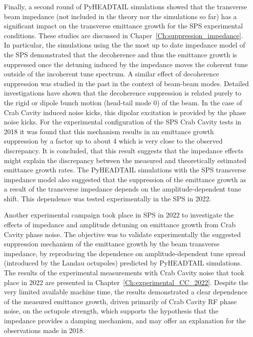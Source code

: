 Finally, a second round of PyHEADTAIL simulations showed that the transverse beam impedance (not included in the theory nor the simulations so far) has a significant impact on the transverse emittance growth for the SPS experimental conditions. These studies are discussed in Chaper~\ref{Ch:suppression_impedance}. In particular, the simulations using the the most up to date impedance model of the SPS demonstrated that the decoherence and thus the emittance growth is suppressed once the detuning induced by the impedance moves the coherent tune outside of the incoherent tune spectrum. A similar effect of decoherence suppression was studied in the past in the context of beam-beam modes. Detailed investigations have shown that the decoherence suppression is related purely to the rigid or dipole bunch motion (head-tail mode 0) of the beam. In the case of Crab Cavity induced noise kicks, this dipolar excitation is provided by the phase noise kicks. For the experimental configuration of the SPS Crab Cavity tests in 2018 it was found that this mechanism results in an emittance growth suppression by a factor up to about 4 which is very close to the observed discrepancy. It is concluded, that this result suggests that the impedance effects might explain the discrepancy between the measured and theoretically estimated emittance growth rates. The PyHEADTAIL simulations with the SPS transverse impedance model also suggested that the suppression of the emittance growth as a result of the transverse impedance depends on the amplitude-dependent tune shift. This dependence was tested experimentally in the SPS in 2022.

Another experimental campaign took place in SPS in 2022 to investigate the effects of impedance and amplitude detuning on emittance growth from Crab Cavity phase noise. The objective was to validate experimentally the suggested suppression mechanism of the emittance growth by the beam transverse impedance, by reproducing the dependence on amplitude-dependent tune spread (introduced by the Landau octupoles) predicted by PyHEADTAIL simulations. 
The results of the experimental measurements with Crab Cavity noise that took place in 2022 are presented in Chapter~\ref{Ch:experimental_CC_2022}. Despite the very limited available machine time, the results demonstrated a clear dependence of the measured emittance growth, driven primarily of Crab Cavity RF phase noise, on the octupole strength, which supports the hypothesis that the impedance provides a damping mechanism, and may offer an explanation for the observations made in 2018.


